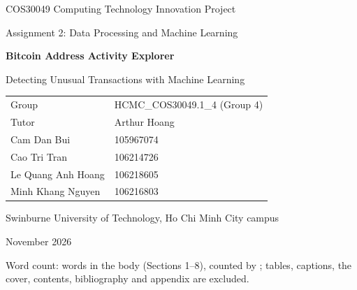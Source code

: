 \begin{titlepage}
\centering
\vspace*{2.2cm}
{\Large COS30049 Computing Technology Innovation Project\par}
\vspace{0.4cm}
{\large Assignment 2: Data Processing and Machine Learning\par}
\vspace{1.6cm}
{\huge\bfseries Bitcoin Address Activity Explorer\par}
\vspace{0.3cm}
{\Large Detecting Unusual Transactions with Machine Learning\par}
\vspace{1.8cm}

\begin{tabular}{@{}ll@{}}
\toprule
Group & HCMC\_COS30049.1\_4 (Group 4) \\
Tutor & Arthur Hoang \\
\midrule
Cam Dan Bui & 105967074 \\
Cao Tri Tran & 106214726 \\
Le Quang Anh Hoang & 106218605 \\
Minh Khang Nguyen & 106216803 \\
\bottomrule
\end{tabular}

\vspace{1.6cm}
Swinburne University of Technology, Ho Chi Minh City campus\par
November 2026\par
\vfill
{\small Word count: words in the body (Sections 1--8), counted by
; tables, captions, the cover, contents, bibliography and appendix are excluded.\par}
\end{titlepage}
